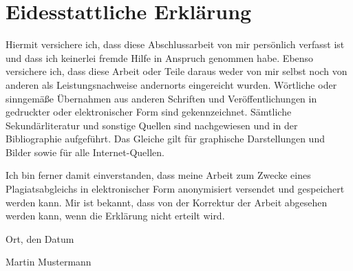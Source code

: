 \chapter*{Eidesstattliche Erkl\"{a}rung}
\thispagestyle{empty}
Hiermit versichere ich, dass diese Abschlussarbeit von mir persönlich verfasst
ist und dass ich keinerlei fremde Hilfe in Anspruch genommen habe. Ebenso
versichere ich, dass diese Arbeit oder Teile daraus weder von mir selbst noch
von anderen als Leistungsnachweise andernorts eingereicht wurden. Wörtliche oder
sinn\-gemäße Übernahmen aus anderen Schriften und Veröffentlichungen in gedruckter
oder elektronischer Form sind gekennzeichnet. Sämtliche Sekundärliteratur und
sonstige Quellen sind nachgewiesen und in der Bibliographie aufgeführt. Das
Glei\-che gilt für graphische Darstellungen und Bilder sowie für alle
Internet-Quellen.

Ich bin ferner damit einverstanden, dass meine Arbeit zum Zwecke eines
Plagiatsabgleichs in elektronischer Form anonymisiert versendet und gespeichert
werden kann. Mir ist bekannt, dass von der Korrektur der Arbeit abgesehen werden
kann, wenn die Erklärung nicht erteilt wird.
\bigskip

\raggedright{Ort, den Datum} \bigskip \bigskip \bigskip

Martin Mustermann